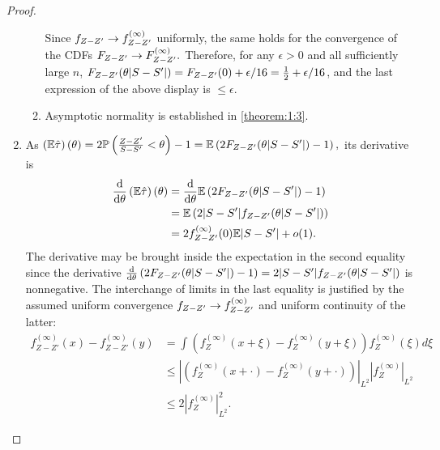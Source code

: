 \documentclass[12pt]{article}
\newcommand{\z}{Z}
\newcommand{\s}{S}
\let\n\relax
\newcommand{\n}[1]{{#1}^{(n)}}
\newcommand{\iinfty}[1]{{#1}^{(\infty)}}
\newcommand{\EE}{\mathbb{E}}
\newcommand{\PP}{\mathbb{P}}
\begin{document}
\begin{proof}
\begin{enumerate}[wide, labelwidth=!, labelindent=0pt]
\begin{enumerate}[wide, labelwidth=!, labelindent=0pt]
Since $\n{f}_{\z-\z'}\to\iinfty{f}_{\z-\z'}$ uniformly, the same holds for the convergence of the CDFs $\n{F}_{\z-\z'}\to\iinfty{F}_{\z-\z'}.$ Therefore, for any $\epsilon>0$ and all sufficiently large $n$, $\n{F}_{\z-\z'}(\theta|\s-\s'|)=\n{F}_{\z-\z'}(0)+\epsilon/16=\frac12+\epsilon/16$, and the last expression of the above display is $\le\epsilon$.

\item Asymptotic normality is established in \ref{theorem:1:3}.

\end{enumerate}






\item \label{theorem:1:3}

  
As $\left(\n{\EE}\hat\tau\right)(\theta)=2\n{\PP}\left(\frac{\z-\z'}{\s-\s'}<\theta\right)-1=\EE\left(2\n{F}_{\z-\z'}(\theta|\s-\s'|)-1\right),$ its derivative is 
\begin{align}
  \frac{\text{d}}{\text{d}\theta}\left(\n{\EE}\hat\tau\right)(\theta) &=
                                                                        \frac{\text{d}}{\text{d}\theta}\EE\left(2\n{F}_{\z-\z'}(\theta|\s-\s'|)-1\right)\\
                                                                      &=\EE\left(2|\s-\s'|\n{f}_{\z-\z'}(\theta|\s-\s'|)\right)\\
                                                                      &=2\iinfty{f}_{\z-\z'}(0)\EE|\s-\s'|+o(1).
\end{align}
The derivative may be brought inside the expectation in the second equality since the derivative $\frac{\text{d}}{\text{d}\theta}\left(2\n{F}_{\z-\z'}(\theta|\s-\s'|)-1\right)=2|\s-\s'|\n{f}_{\z-\z'}(\theta|\s-\s'|)$ is nonnegative. The interchange of limits in the last equality is justified by the assumed uniform convergence $\n{f}_{\z-\z'}\to\iinfty{f}_{\z-\z'}$ and uniform continuity of the latter:
\begin{align}
  \iinfty{f}_{\z-\z'}(x)-\iinfty{f}_{\z-\z'}(y)&=\int\left(\iinfty{f}_{\z}(x+\xi)-\iinfty{f}_{\z}(y+\xi)\right)\iinfty{f}_{\z}(\xi)d\xi\\
                                               &\le \left|\left(\iinfty{f}_{\z}(x+\cdot)-\iinfty{f}_{\z}(y+\cdot)\right)\right|_{L^2}
                                                 \left|\iinfty{f}_{\z}\right|_{L^2}\\
  &\le 2\left|\iinfty{f}_{\z}\right|_{L^2}^2.
\end{align}



\end{enumerate}
\end{proof}
\end{document}
